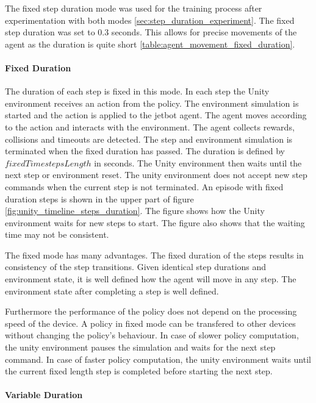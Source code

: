 The fixed step duration mode was used for the training process after experimentation with both modes \ref{sec:step_duration_experiment}. The fixed step duration was set to 0.3 seconds. This allows for precise movements of the agent as the duration is quite short \ref{table:agent_movement_fixed_duration}.

\paragraph{Fixed Duration}

The duration of each step is fixed in this mode. In each step the Unity environment receives an action from the policy. The environment simulation is started and the action is applied to the jetbot agent. The agent moves according to the action and interacts with the environment. The agent collects rewards, collisions and timeouts are detected. The step and environment simulation is terminated when the fixed duration has passed. The duration is defined by $fixedTimestepsLength$ in seconds. The Unity environment then waits until the next step or environment reset. The unity environment does not accept new step commands when the current step is not terminated.
An episode with fixed duration steps is shown in the upper part of figure \ref{fig:unity_timeline_steps_duration}. The figure shows how the Unity environment waits for new steps to start. The figure also shows that the waiting time may not be consistent.

The fixed mode has many advantages. The fixed duration of the steps results in consistency of the step transitions. Given identical step durations and environment state, it is well defined how the agent will move in any step. The environment state after completing a step is well defined.

Furthermore the performance of the policy does not depend on the processing speed of the device. A policy in fixed mode can be transfered to other devices without changing the policy's behaviour. In case of slower policy computation, the unity environment pauses the simulation and waits for the next step command. In case of faster policy computation, the unity environment waits until the current fixed length step is completed before starting the next step.


\paragraph{Variable Duration}

